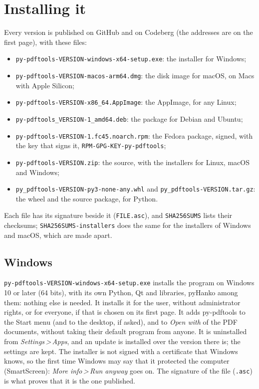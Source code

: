\documentclass[12pt,
              article,
              oneside
              ]{memoir}
\newcommand*{\menu}[1]{\textit{#1}}
\newcommand*{\then}{\,>\,}
\begin{document}
\section{Installing it}
\label{sec:install}

Every version is published on GitHub and on Codeberg (the addresses are on
the first page), with these files:

%
\begin{itemize}
\item \texttt{py-pdftools-VERSION-windows-x64-setup.exe}: the installer
  for Windows;
\item \texttt{py-pdftools-VERSION-macos-arm64.dmg}: the disk image for
  macOS, on Macs with Apple Silicon;
\item \texttt{py-pdftools-VERSION-x86\_64.AppImage}: the AppImage, for any
  Linux;
\item \texttt{py-pdftools\_VERSION-1\_amd64.deb}: the package for Debian and
  Ubuntu;
\item \texttt{py-pdftools-VERSION-1.fc45.noarch.rpm}: the Fedora package,
  signed, with the key that signs it, \texttt{RPM-GPG-KEY-py-pdftools};
\item \texttt{py-pdftools-VERSION.zip}: the source, with the installers
  for Linux, macOS and Windows;
\item \texttt{py\_pdftools-VERSION-py3-none-any.whl} and
  \texttt{py\_pdftools-VERSION.tar.gz}: the wheel and the source package,
  for Python.
\end{itemize}

\noindent Each file has its signature beside it (\texttt{FILE.asc}), and
\texttt{SHA256SUMS} lists their checksums;
\texttt{SHA256SUMS-installers} does the same for the installers of Windows
and macOS, which are made apart.

\subsection{Windows}

%
\texttt{py-pdftools-VERSION-windows-x64-setup.exe} installs the program
on Windows 10 or later (64 bits), with its own Python, Qt and libraries,
pyHanko among them: nothing else is needed. It installs it for the user,
without administrator rights, or for everyone, if that is chosen on its
first page. It adds py-pdftools to the Start menu (and to the desktop, if
asked), and to \menu{Open with} of the PDF documents, without taking
their default program from anyone. It is uninstalled from
\menu{Settings\then Apps}, and an update is installed over the version
there is; the settings are kept. The installer is not signed with a
certificate that Windows knows, so the first time Windows may say that it
protected the computer (SmartScreen): \menu{More info\then Run anyway}
goes on. The signature of the file (\texttt{.asc}) is what proves that it
is the one published.
\end{document}
